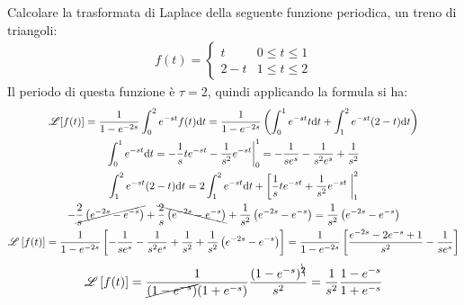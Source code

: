 \documentclass{article}
\newcommand{\df}{\mathrm{d}}
\numberwithin{equation}{subsection}
\begin{document}
Calcolare la trasformata di Laplace della seguente funzione periodica, un treno di triangoli:
\begin{gather*}
    f(t)=\begin{cases}
        t&0\leq t\leq1\\
        2-t&1\leq t\leq2
    \end{cases}
\end{gather*}
Il periodo di questa funzione è $\tau=2$, quindi applicando la formula si ha:
\begin{gather*}
    \mathscr{L}[f(t)]=\frac{1}{1-e^{-2s}}\int_0^2e^{-st}f(t)\df t=\frac{1}{1-e^{-2s}}\left(\int_0^1e^{-st}t\df t+\int_1^2e^{-st}(2-t)\df t\right)\\
    \int_0^1e^{-st}\df t=-\frac{1}{s}te^{-st}-\frac{1}{s^2}e^{-st}\bigg|_0^1=-\frac{1}{se^{s}}-\frac{1}{s^2e^s}+\frac{1}{s^2}\\
    \int_1^2e^{-st}(2-t)\df t=2\int_1^2e^{-st}\df t+\left[\frac{1}{s}te^{-st}+\frac{1}{s^2}e^{-st}\right.\bigg|_1^2\\
    -\cancel{\frac{2}{s}\left(e^{-2s}-e^{-s}\right)}+\bcancel{\frac{2}{s}\left(e^{-2s}-e^{-s}\right)}+\frac{1}{s^2}\left(e^{-2s}-e^{-s}\right)=\frac{1}{s^2}\left(e^{-2s}-e^{-s}\right)\\
    \mathscr{L}\left[f(t)\right]=
    \frac{1}{1-e^{-2s}}\left[-\frac{1}{se^{s}}-\frac{1}{s^2e^s}+\frac{1}{s^2}+\frac{1}{s^2}\left(e^{-2s}-e^{-s}\right)\right]=\frac{1}{1-e^{-2s}}\left[\frac{e^{-2s}-2e^{-s}+1}{s^2}-\frac{1}{se^{s}}\right]
\end{gather*} 
\begin{gather*}
    \mathscr{L}\left[f(t)\right]=\frac{1}{\cancel{(1-e^{-s})}(1+e^{-s})}\frac{(1-e^{-s})^{\bcancel{2}}}{s^2}=\frac{1}{s^2}\frac{1-e^{-s}}{1+e^{-s}}
\end{gather*}
\end{document}
